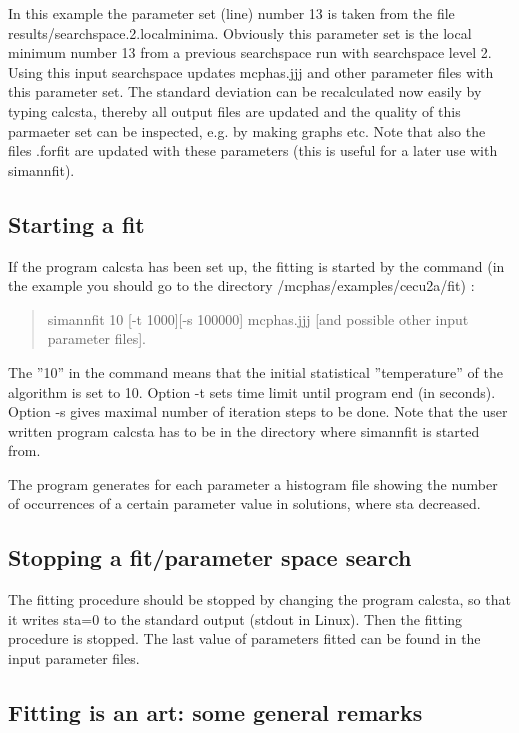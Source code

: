 In this example the parameter set (line) number 13 is taken from the
 file {\prg results/searchspace.2.localminima}. Obviously this parameter set is the local minimum number 13
from a previous searchspace run with searchspace level 2. Using this input
 searchspace updates {\prg mcphas.jjj} and
other parameter files with this parameter set.
The standard deviation can be recalculated now easily by typing {\prg calcsta}, thereby all
output files are updated and the quality of this parmaeter set can be inspected, e.g. by
making graphs etc.
Note that also the files {\prg *.forfit} are updated with
these parameters (this is useful for a later use with {\prg simannfit}).

\subsection{Starting a fit}

If the program {\prg calcsta} has been set up, the fitting is started
by the command (in the example you should go to the directory {\prg /mcphas/examples/cecu2a/fit}) 
:

\begin{quote}
 {\prg simannfit 10 [-t 1000][-s 100000] mcphas.jjj [and possible other input parameter files]}.
\end{quote}

The ''10'' in the command means that the initial statistical
''temperature'' of the algorithm
is set to 10.  
Option -t sets time limit until program end (in seconds).
Option -s gives maximal number of iteration steps to be done.
Note that the user written program {\prg calcsta} has to be in the
directory where {\prg simannfit} is started from.

The program generates for each parameter a histogram file showing the number of occurrences
of a certain parameter value in solutions, where sta decreased.

\subsection{Stopping a fit/parameter space search}

The fitting procedure should be stopped by changing the program {\prg calcsta}, so that it
writes {\prg sta=0} to the standard output (stdout in Linux). Then the fitting
procedure is stopped. The last value of parameters fitted can be found in the
input parameter files.

\subsection{Fitting is an art: some general remarks}

